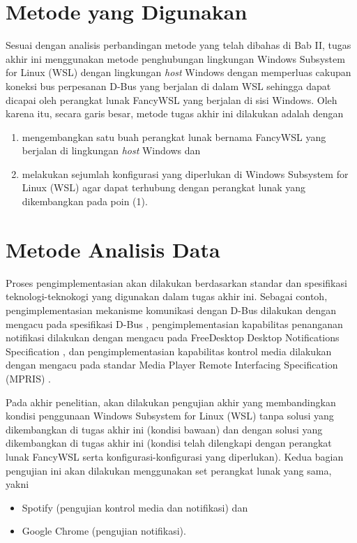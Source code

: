 \section{Metode yang Digunakan}

Sesuai dengan analisis perbandingan metode yang telah dibahas di Bab II, tugas akhir ini menggunakan metode penghubungan lingkungan Windows Subsystem for Linux (WSL) dengan lingkungan \textit{host} Windows dengan memperluas cakupan koneksi bus perpesanan D-Bus yang berjalan di dalam WSL sehingga dapat dicapai oleh perangkat lunak FancyWSL yang berjalan di sisi Windows. Oleh karena itu, secara garis besar, metode tugas akhir ini dilakukan adalah dengan
\begin{enumerate}
    \item mengembangkan satu buah perangkat lunak bernama FancyWSL yang berjalan di lingkungan \textit{host} Windows dan
    \item melakukan sejumlah konfigurasi yang diperlukan di Windows Subsystem for Linux (WSL) agar dapat terhubung dengan perangkat lunak yang dikembangkan pada poin (1).
\end{enumerate}

\section{Metode Analisis Data}

Proses pengimplementasian akan dilakukan berdasarkan standar dan spesifikasi teknologi-teknokogi yang digunakan dalam tugas akhir ini. Sebagai contoh, pengimplementasian mekanisme komunikasi dengan D-Bus dilakukan dengan mengacu pada spesifikasi D-Bus \cite{dbus-specification}, pengimplementasian kapabilitas penanganan notifikasi dilakukan dengan mengacu pada FreeDesktop Desktop Notifications Specification \cite{xdg-desktop-notifications-specification}, dan pengimplementasian kapabilitas kontrol media dilakukan dengan mengacu pada standar Media Player Remote Interfacing Specification (MPRIS) \cite{xdg-mpris-specification}.

Pada akhir penelitian, akan dilakukan pengujian akhir yang membandingkan kondisi penggunaan Windows Subsystem for Linux (WSL) tanpa solusi yang dikembangkan di tugas akhir ini (kondisi bawaan) dan dengan solusi yang dikembangkan di tugas akhir ini (kondisi telah dilengkapi dengan perangkat lunak FancyWSL serta konfigurasi-konfigurasi yang diperlukan). Kedua bagian pengujian ini akan dilakukan menggunakan set perangkat lunak yang sama, yakni
\begin{itemize}
    \item Spotify (pengujian kontrol media dan notifikasi) dan
    \item Google Chrome (pengujian notifikasi).
\end{itemize}

